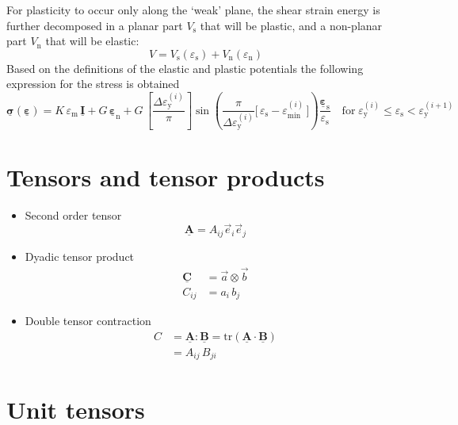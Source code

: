 \documentclass[times,namecite]{goose-article}
\newcommand\T[1]{\underline{\bm{{#1}}}}
\begin{document}
For plasticity to occur only along the `weak' plane, the shear strain energy is further decomposed in a planar part $V_\mathrm{s}$ that will be plastic, and a non-planar part $V_\mathrm{n}$ that will be elastic:
\begin{equation}
  V
  =
  V_\mathrm{s} ( \varepsilon_\mathrm{s} )
  +
  V_\mathrm{n} ( \varepsilon_\mathrm{n} )
\end{equation}
Based on the definitions of the elastic and plastic potentials the following expression for the stress is obtained
\begin{equation}
  \T{\sigma} ( \T{\varepsilon} )
  =
  K \, \varepsilon_\mathrm{m} \, \T{I}
  +
  G \, \T{\varepsilon}_\mathrm{n}
  +
  G \,
  \left[ \frac{\Delta \varepsilon_\mathrm{y}^{(i)}}{\pi} \right]
  \sin \left(
    \frac{ \pi }{ \Delta \varepsilon_\mathrm{y}^{(i)} }
    \Big[\, \varepsilon_\mathrm{s} - \varepsilon_\mathrm{min}^{(i)} \,\Big]
  \right)
  \frac{\T{\varepsilon}_\mathrm{s}}{\varepsilon_\mathrm{s}}
  \quad
  \mathrm{for}
  \;
  \varepsilon_\mathrm{y}^{(i)} \leq \varepsilon_\mathrm{s} < \varepsilon_\mathrm{y}^{(i+1)}
\end{equation}

\appendix

\vfill\newpage
\section{Tensors and tensor products}
\label{sec:nomenclature:tensor}

\begin{itemize}
%
\item Second order tensor
\begin{equation}
  \T{A} = A_{ij} \vec{e}_i \vec{e}_j
\end{equation}
%
\item Dyadic tensor product
\begin{align}
  \T{C} &= \vec{a} \otimes \vec{b} \\
  C_{ij} &= a_{i} \, b_{j}
\end{align}
%
\item Double tensor contraction
\begin{align}
  C &= \T{A} : \T{B} = \mathrm{tr} \left( \T{A} \cdot \T{B} \right) \\
    &= A_{ij} \, B_{ji}
\end{align}
%
\end{itemize}

\section{Unit tensors}
\label{sec:nomenclature:unit}
\end{document}

